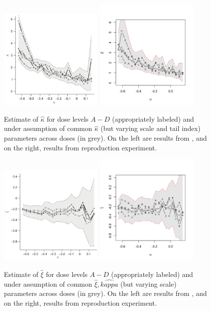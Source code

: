 \documentclass[12pt]{article}
\theoremstyle{definition}
\theoremstyle{definition}
\begin{document}
\begin{figure}[H]
\begin{center}
{\includegraphics[width=2.0in]{project/papafiles/fig7.kap.papa.png}}
{\includegraphics[width=2.0in]{project/papafiles/fig7.kap.me.png}}
\caption{Estimate of $\hat\kappa$ for dose levels $A-D$ (appropriately labeled) and  under assumption of common $\hat\kappa$ (but varying scale and tail index) parameters across doses (in grey). On the left are results from \cite{papatawn}, and on the right, results from reproduction experiment.}
{\includegraphics[width=2.0in]{project/papafiles/fig7.xi.papa.png}}
{\includegraphics[width=2.0in]{project/papafiles/fig7.xi.me.png}}
\caption{Estimate of $\hat\xi$ for dose levels $A-D$ (appropriately labeled) and  under assumption of common $\hat\xi, \hat{kappa}$ (but varying scale) parameters across doses (in grey). On the left are results from \cite{papatawn}, and on the right, results from reproduction experiment.}
\end{center}
\end{figure}
\end{document}
